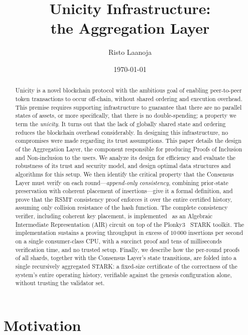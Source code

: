 \documentclass[twocolumn]{article}
\title{Unicity Infrastructure:\\
    the Aggregation Layer}
\author[1]{Risto Laanoja}
\affil[1]{Unicity Labs}
\date{\today}
\begin{document}
\maketitle

\begin{abstract}
Unicity is a novel blockchain protocol with the ambitious goal of enabling peer-to-peer token transactions to occur off-chain, without shared ordering and execution overhead. This premise requires supporting infrastructure to guarantee that there are no parallel states of assets, or more specifically, that there is no double-spending; a property we term the \textit{unicity}. It turns out that the lack of globally shared state and ordering reduces the blockchain overhead considerably. In designing this infrastructure, no compromises were made regarding its trust assumptions. This paper details the design of the Aggregation Layer, the component responsible for producing Proofs of Inclusion and Non-inclusion to the users. We analyze its design for efficiency and evaluate the robustness of its trust and security model, and design optimal data structures and algorithms for this setup. We then identify the critical property that the Consensus Layer must verify on each round---\emph{append-only consistency}, combining prior-state preservation with coherent placement of insertions---give it a formal definition, and prove that the RSMT consistency proof enforces it over the entire certified history, assuming only collision resistance of the hash function. The complete consistency verifier, including coherent key placement, is implemented~\cite{rsmtair} as an Algebraic Intermediate Representation (AIR) circuit on top of the Plonky3~\cite{plonky3} STARK toolkit. The implementation sustains a proving throughput in excess of $10\,000$ insertions per second on a single consumer-class CPU, with a succinct proof and tens of milliseconds verification time, and no trusted setup. Finally, we describe how the per-round proofs of all shards, together with the Consensus Layer's state transitions, are folded into a single recursively aggregated STARK: a fixed-size certificate of the correctness of the system's entire operating history, verifiable against the genesis configuration alone, without trusting the validator set.
\end{abstract}


\section{Motivation}
\end{document}
